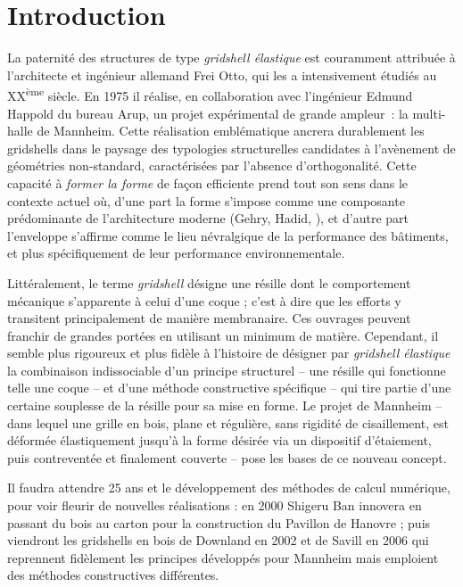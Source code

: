 
\chapter{Introduction}\label{chp:intro}

La paternité des structures de type \emph{gridshell élastique} est couramment attribuée à l'architecte et ingénieur allemand Frei Otto, qui les a intensivement étudiés au XX\textsuperscript{ème} siècle. En 1975 il réalise, en collaboration avec l'ingénieur Edmund Happold du bureau Arup, un projet expérimental de grande ampleur~: la multi-halle de Mannheim. Cette réalisation emblématique ancrera durablement les gridshells dans le paysage des typologies structurelles candidates à l'avènement de géométries non-standard, caractérisées par l'absence d'orthogonalité. Cette capacité à \emph{former la forme} de façon efficiente prend tout son sens dans le contexte actuel où, d'une part la forme s'impose comme une composante prédominante de l'architecture moderne (Gehry, Hadid, \telp{}), et d'autre part l'enveloppe s'affirme comme le lieu névralgique de la performance des bâtiments, et plus spécifiquement de leur performance environnementale.

Littéralement, le terme \emph{gridshell} désigne une résille dont le comportement mécanique s'apparente à celui d'une coque ; c'est à dire que les efforts y transitent principalement de manière membranaire. Ces ouvrages peuvent franchir de grandes portées en utilisant un minimum de matière. Cependant, il semble plus rigoureux et plus fidèle à l'histoire de désigner par \emph{gridshell élastique} la combinaison indissociable d'un principe structurel – une résille qui fonctionne telle une coque – et d'une méthode constructive spécifique – qui tire partie d'une certaine souplesse de la résille pour sa mise en forme. Le projet de Mannheim – dans lequel une grille en bois, plane et régulière, sans rigidité de cisaillement, est déformée élastiquement jusqu'à la forme désirée via un dispositif d'étaiement, puis contreventée et finalement couverte – pose les bases de ce nouveau concept.

Il faudra attendre 25 ans et le développement des méthodes de calcul numérique, pour voir fleurir de nouvelles réalisations : en 2000 Shigeru Ban innovera en passant du bois au carton pour la construction du Pavillon de Hanovre  ; puis viendront les gridshells en bois de Downland en 2002 et de Savill en 2006 qui reprennent fidèlement les principes développés pour Mannheim mais emploient des méthodes constructives différentes.

